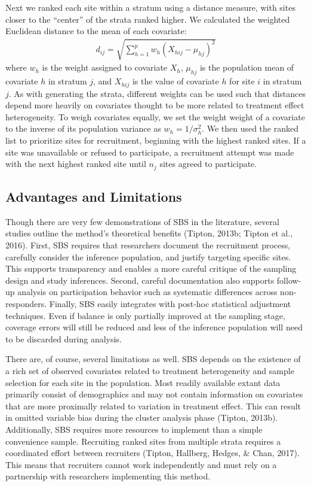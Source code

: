 \documentclass[
  english,
  man,floatsintext]{apa6}
\begin{document}
Next we ranked each site within a stratum using a distance measure, with sites closer to the \enquote{center} of the strata ranked higher. We calculated the weighted Euclidean distance to the mean of each covariate:
\begin{align} \label{eq:euclid}
d_{ij} = \sqrt{\sum^p_{h=1}w_h(X_{hij} - \mu_{hj})^2}
\end{align}
where \(w_h\) is the weight assigned to covariate \(X_h\), \(\mu_{hj}\) is the population mean of covariate \(h\) in stratum \(j\), and \(X_{hij}\) is the value of covariate \(h\) for site \(i\) in stratum \(j\). As with generating the strata, different weights can be used such that distances depend more heavily on covariates thought to be more related to treatment effect heterogeneity. To weigh covariates equally, we set the weight weight of a covariate to the inverse of its population variance as \(w_h = 1/\sigma^2_h\). We then used the ranked list to prioritize sites for recruitment, beginning with the highest ranked sites. If a site was unavailable or refused to participate, a recruitment attempt was made with the next highest ranked site until \(n_j\) sites agreed to participate.

\hypertarget{advantages-and-limitations}{%
\subsection{Advantages and Limitations}\label{advantages-and-limitations}}

Though there are very few demonstrations of SBS in the literature, several studies outline the method's theoretical benefits (Tipton, 2013b; Tipton et al., 2016). First, SBS requires that researchers document the recruitment process, carefully consider the inference population, and justify targeting specific sites. This supports transparency and enables a more careful critique of the sampling design and study inferences. Second, careful documentation also supports follow-up analysis on participation behavior such as systematic differences across non-responders. Finally, SBS easily integrates with post-hoc statistical adjustment techniques. Even if balance is only partially improved at the sampling stage, coverage errors will still be reduced and less of the inference population will need to be discarded during analysis.

There are, of course, several limitations as well. SBS depends on the existence of a rich set of observed covariates related to treatment heterogeneity and sample selection for each site in the population. Most readily available extant data primarily consist of demographics and may not contain information on covariates that are more proximally related to variation in treatment effect. This can result in omitted variable bias during the cluster analysis phase (Tipton, 2013b). Additionally, SBS requires more resources to implement than a simple convenience sample. Recruiting ranked sites from multiple strata requires a coordinated effort between recruiters (Tipton, Hallberg, Hedges, \& Chan, 2017). This means that recruiters cannot work independently and must rely on a partnership with researchers implementing this method.
\end{document}
